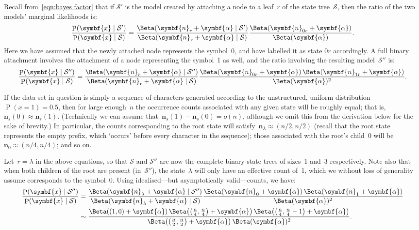 \documentclass[12pt,a4paper]{article}
\newcommand\mc[1]{\mathcal{#1}}               %
\newcommand\ub[1]{\symbf{#1}}                 %
\DeclareMathOperator\Pb{P}                    %
\DeclarePairedDelimiter\lr{\lparen}{\rparen}  %
\newcommand\peq{\mathop{=}}   %
\begin{document}
Recall from~\eqref{eqn:bayes factor} that if \(\mc{S}'\) is the model created by
attaching a node to a leaf~\(r\) of the state tree~\(\mc{S}\), then the ratio of
the two models' marginal likelihoods is:
\begin{equation}
  \frac{\Pb\lr{\ub{x} \mid \mc{S}'}}{\Pb\lr{\ub{x} \mid \mc{S}}} =
    \frac{\Beta\lr{\ub{n}_r + \ub{\alpha} \mid \mc{S}'}}
    {\Beta\lr{\ub{n}_r + \ub{\alpha} \mid \mc{S}}}
    \frac{\Beta\lr{\ub{n}_{0r} + \ub{\alpha}}}{\Beta\lr{\ub{\alpha}}}.
\end{equation}
Here we have assumed that the newly attached node represents the symbol~0, and
have labelled it as state \(0r\) accordingly. A full binary attachment involves
the attachment of a node representing the symbol~1 as well, and the ratio
involving the resulting model~\(\mc{S}''\) is:
\begin{equation}\label{eqn:bayes factor binary}
  \frac{\Pb\lr{\ub{x} \mid \mc{S}''}}{\Pb\lr{\ub{x} \mid \mc{S}}} =
    \frac{\Beta\lr{\ub{n}_r + \ub{\alpha} \mid \mc{S}''}}
    {\Beta\lr{\ub{n}_r + \ub{\alpha} \mid \mc{S}}}
    \frac{\Beta\lr{\ub{n}_{0r} + \ub{\alpha}}\,
    \Beta\lr{\ub{n}_{1r} + \ub{\alpha}}}{\Beta\lr{\ub{\alpha}}^2}.
\end{equation}

If the data set in question is simply a sequence of characters generated
according to the unstructured, uniform distribution~\(\Pb(x \peq 1) = 0.5\),
then for large enough~\(n\) the occurrence counts associated with any given
state will be roughly equal; that is, \(\ub{n}_s(0) \approx \ub{n}_s(1)\).
(Technically we can assume that~\(\ub{n}_s(1) - \ub{n}_s(0) = o(n)\), although
we omit this from the derivation below for the sake of brevity.) In particular,
the counts corresponding to the root state will satisfy~\(\ub{n}_{\lambda}
\approx (n/2, n/2)\) (recall that the root state represents the empty prefix,
which `occurs' before every character in the sequence); those associated with
the root's child~0 will be~\(\ub{n}_0 \approx (n/4, n/4)\); and so on.

Let~\(r = \lambda\) in the above equations, so that \(\mc{S}\) and \(\mc{S}''\)
are now the complete binary state trees of sizes~1 and~3 respectively. Note also
that when both children of the root are present (in~\(\mc{S}''\)), the
state~\(\lambda\) will only have an effective count of~1, which we without loss
of generality assume corresponds to the symbol~0. Using idealised---but
asymptotically valid---counts, we have:
\begin{align}\label{eqn:bayes factor asymptotic}
  \frac{\Pb(\ub{x} \mid \mc{S}'')}{\Pb(\ub{x} \mid \mc{S})} &=
    \frac{\Beta(\ub{n}_{\lambda} + \ub{\alpha} \mid \mc{S}'')}
    {\Beta(\ub{n}_{\lambda} + \ub{\alpha} \mid \mc{S})}
    \frac{\Beta(\ub{n}_0 + \ub{\alpha})\, \Beta(\ub{n}_1 + \ub{\alpha})}
    {\Beta(\ub{\alpha})^2} \nonumber \\
  &\sim \frac{\Beta\lr*{\lr*{1, 0} + \ub{\alpha}}\,
    \Beta\lr*{\lr*{\frac{n}{4}, \frac{n}{4}} + \ub{\alpha}}\,
    \Beta\lr*{\lr*{\frac{n}{4}, \frac{n}{4}-1} + \ub{\alpha}}}
    {\Beta\lr*{\lr*{\frac{n}{2}, \frac{n}{2}} + \ub{\alpha}}\,
    \Beta(\ub{\alpha})^2}.
\end{align}
\end{document}
